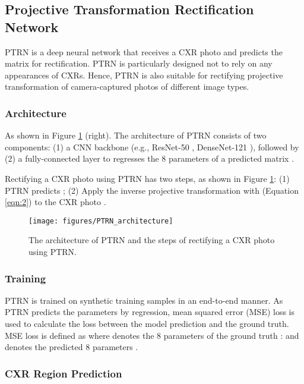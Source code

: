 \documentclass[preprint, 12pt]{elsarticle}
\begin{document}
\subsection{Projective Transformation Rectification Network}

PTRN is a deep neural network that receives a CXR photo  and predicts the matrix  for rectification. PTRN is particularly designed not to rely on any appearances of CXRs. Hence, PTRN is also suitable for rectifying projective transformation of camera-captured photos of different image types.

\subsubsection{Architecture}

As shown in Figure \ref{fig:PTRN_architecture} (right). The architecture of PTRN consists of two components: (1) a CNN backbone (e.g., ResNet-50 \cite{he2016deep}, DenseNet-121 \cite{huang2017densely}), followed by (2) a fully-connected layer to regresses the 8 parameters  of a predicted matrix .

Rectifying a CXR photo  using PTRN has two steps, as shown in Figure \ref{fig:PTRN_architecture}: (1) PTRN predicts  ; (2) Apply the inverse projective transformation with  (Equation \ref{eqn:2}) to the CXR photo  .

\begin{figure}
    \centering
    \texttt{[image: figures/PTRN\_architecture]}
    \caption{The architecture of PTRN and the steps of rectifying a CXR photo using PTRN.}
    \label{fig:PTRN_architecture}
\end{figure}

\subsubsection{Training}

PTRN is trained on synthetic training samples  in an end-to-end manner. As PTRN predicts the parameters by regression, mean squared error (MSE) loss is used to calculate the loss between the model prediction and the ground truth. MSE loss is defined as  where  denotes the 8 parameters of the ground truth :  and  denotes the predicted 8  parameters .

\subsubsection{CXR Region Prediction}
\end{document}
